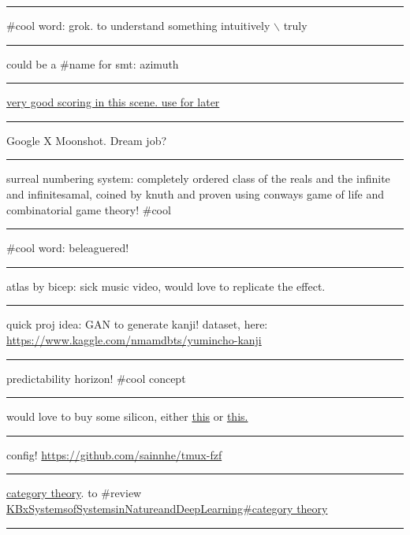 \documentclass[letterpaper]{article}
\begin{document}
\noindent\rule{\textwidth}{0.5pt}

\#cool word: grok. to understand something intuitively $\backslash$ truly

\noindent\rule{\textwidth}{0.5pt}

could be a \#name for smt: azimuth

\noindent\rule{\textwidth}{0.5pt}

\href{https://www.youtube.com/watch?v=uvap4gEOC5I\&ab\_channel=SonyPicturesHomeEntertainment}{very
good scoring in this scene. use for later}

\noindent\rule{\textwidth}{0.5pt}

Google X Moonshot. Dream job?

\noindent\rule{\textwidth}{0.5pt}

surreal numbering system: completely ordered class of the reals and the
infinite and infinitesamal, coined by knuth and proven using conways
game of life and combinatorial game theory! \#cool

\noindent\rule{\textwidth}{0.5pt}

\#cool word: beleaguered!

\noindent\rule{\textwidth}{0.5pt}

atlas by bicep: sick music video, would love to replicate the effect.

\noindent\rule{\textwidth}{0.5pt}

quick proj idea: GAN to generate kanji! dataset, here:
\url{https://www.kaggle.com/nmamdbts/yumincho-kanji}

\noindent\rule{\textwidth}{0.5pt}

predictability horizon! \#cool concept

\noindent\rule{\textwidth}{0.5pt}

would love to buy some silicon, either
\href{https://www.amazon.com/Silicon-Metal-99-999-Pure/dp/B08FVLJM8L}{this}
or
\href{https://www.amazon.com/Silicon-Wafer-Single-Sided-Polish/dp/B08RZ5ZYNF/}{this.}

\noindent\rule{\textwidth}{0.5pt}

config! \url{https://github.com/sainnhe/tmux-fzf}

\noindent\rule{\textwidth}{0.5pt}

\href{https://ncatlab.org/nlab/show/category+theory}{category theory}. to
\#review \href{KBxSystemsofSystemsinNatureandDeepLearning\#category theory.org}{KBxSystemsofSystemsinNatureandDeepLearning\#category theory}

\noindent\rule{\textwidth}{0.5pt}
\end{document}

